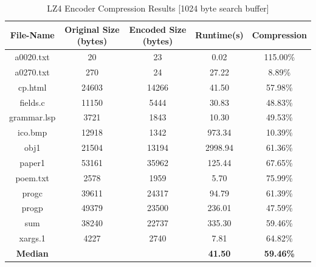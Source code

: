 \documentclass[12pt]{article}
\begin{document}
\begin{table}[H]
	\centering
	\begin{tabular}{| c | c | c | c | c |} 
		\hline
		File-Name & Original Size (bytes) & Encoded Size (bytes) & Runtime(s) & Compression\\
		\hline
		a0020.txt & 20 & 23 & 0.02 & 115.00\%\\
		\hline
		a0270.txt & 270 & 24 & 27.22 & 8.89\%\\
		\hline
		cp.html & 24603 & 14266 & 41.50 & 57.98\%\\
		\hline
		fields.c & 11150 & 5444 & 30.83 & 48.83\%\\
		\hline
		grammar.lsp & 3721 & 1843 & 10.30 & 49.53\%\\
		\hline
		ico.bmp & 12918 & 1342 & 973.34 & 10.39\%\\
		\hline
		obj1 & 21504 & 13194 & 2998.94 & 61.36\%\\
		\hline
		paper1 & 53161 & 35962 & 125.44 & 67.65\%\\
		\hline
		poem.txt & 2578 & 1959 & 5.70 & 75.99\%\\
		\hline
		progc & 39611 & 24317 & 94.79 & 61.39\%\\
		\hline
		progp & 49379 & 23500 & 236.01 & 47.59\%\\
		\hline
		sum & 38240 & 22737 & 335.30 & 59.46\%\\
		\hline
		xargs.1 & 4227 & 2740 & 7.81 & 64.82\%\\
		\Xhline{3\arrayrulewidth}
		\textbf{Median} & & & \textbf{41.50} & \textbf{59.46\%}\\
		\hline
	\end{tabular}
	\caption{LZ4 Encoder Compression Results [1024 byte search buffer]}
	\label{lz4_enc_results1024}
\end{table}
\end{document}
